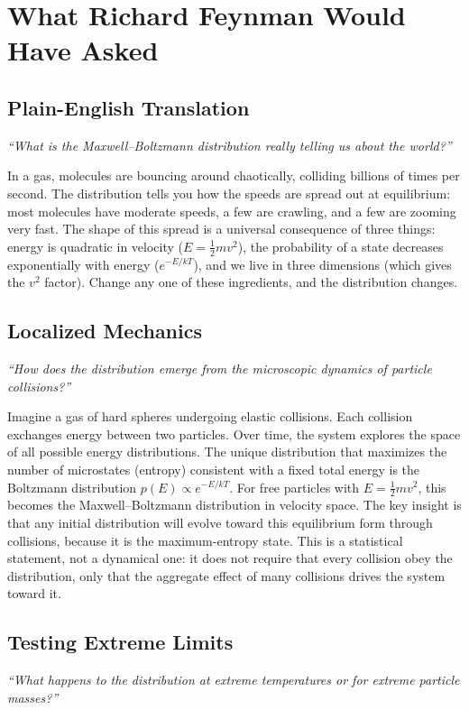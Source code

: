\section*{What Richard Feynman Would Have Asked}

\subsection*{Plain-English Translation}
\textit{``What is the Maxwell--Boltzmann distribution really telling us about the world?''}

In a gas, molecules are bouncing around chaotically, colliding billions of times per second. The distribution tells you how the speeds are spread out at equilibrium: most molecules have moderate speeds, a few are crawling, and a few are zooming very fast. The shape of this spread is a universal consequence of three things: energy is quadratic in velocity ($E = \frac{1}{2}mv^{2}$), the probability of a state decreases exponentially with energy ($e^{-E/kT}$), and we live in three dimensions (which gives the $v^{2}$ factor). Change any one of these ingredients, and the distribution changes.

\subsection*{Localized Mechanics}
\textit{``How does the distribution emerge from the microscopic dynamics of particle collisions?''}

Imagine a gas of hard spheres undergoing elastic collisions. Each collision exchanges energy between two particles. Over time, the system explores the space of all possible energy distributions. The unique distribution that maximizes the number of microstates (entropy) consistent with a fixed total energy is the Boltzmann distribution $p(E) \propto e^{-E/kT}$. For free particles with $E = \frac{1}{2}mv^{2}$, this becomes the Maxwell--Boltzmann distribution in velocity space. The key insight is that any initial distribution will evolve toward this equilibrium form through collisions, because it is the maximum-entropy state. This is a statistical statement, not a dynamical one: it does not require that every collision obey the distribution, only that the aggregate effect of many collisions drives the system toward it.

\subsection*{Testing Extreme Limits}
\textit{``What happens to the distribution at extreme temperatures or for extreme particle masses?''}

